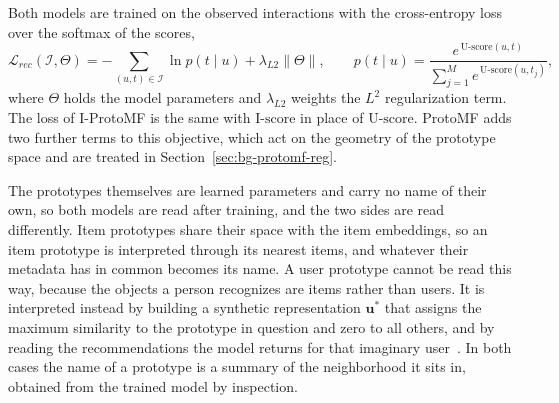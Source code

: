 Both models are trained on the observed interactions with the
cross-entropy loss over the softmax of the scores,
\begin{equation}
\mathcal{L}_{rec}(\mathcal{I}, \Theta) =
- \sum_{(u,t) \in \mathcal{I}} \ln p(t \mid u) +
\lambda_{L2} \lVert \Theta \rVert,
\qquad
p(t \mid u) = \frac{e^{\,\text{U-score}(u,t)}}
                   {\sum_{j=1}^{M} e^{\,\text{U-score}(u,t_j)}},
\label{eq:proto-rec-loss}
\end{equation}
where $\Theta$ holds the model parameters and $\lambda_{L2}$ weights the $L^2$
regularization term. The loss of I-ProtoMF is the same with
$\text{I-score}$ in place of $\text{U-score}$. ProtoMF adds two further terms
to this objective, which act on the geometry of the prototype space and are
treated in Section~\ref{sec:bg-protomf-reg}.

The prototypes themselves are learned parameters and carry no name of their
own, so both models are read after training, and the two sides are read
differently. Item prototypes share their space with the item embeddings, so an
item prototype is interpreted through its nearest items, and whatever their
metadata has in common becomes its name. A user prototype cannot be read this
way, because the objects a person recognizes are items rather than users. It
is interpreted instead by building a synthetic representation $\mathbf{u}^*$
that assigns the maximum similarity to the prototype in question and zero to
all others, and by reading the recommendations the model returns for that
imaginary user~\cite{melchiorre2022protomf}. In both cases the name of a
prototype is a summary of the neighborhood it sits in, obtained from the
trained model by inspection.
